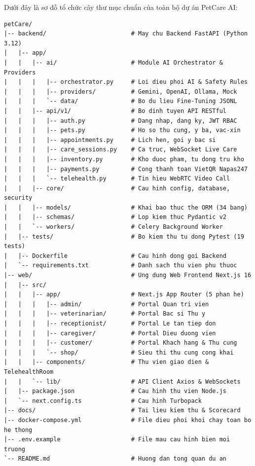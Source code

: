 Dưới đây là sơ đồ tổ chức cây thư mục chuẩn của toàn bộ dự án PetCare AI:
\begin{lstlisting}[language={}, caption={Cấu trúc cây thư mục mã nguồn dự án PetCare AI}, label={lst:tree}]
petCare/
|-- backend/                        # May chu Backend FastAPI (Python 3.12)
|   |-- app/
|   |   |-- ai/                     # Module AI Orchestrator & Providers
|   |   |   |-- orchestrator.py     # Loi dieu phoi AI & Safety Rules
|   |   |   |-- providers/          # Gemini, OpenAI, Ollama, Mock
|   |   |   `-- data/               # Bo du lieu Fine-Tuning JSONL
|   |   |-- api/v1/                 # Bo dinh tuyen API RESTful
|   |   |   |-- auth.py             # Dang nhap, dang ky, JWT RBAC
|   |   |   |-- pets.py             # Ho so thu cung, y ba, vac-xin
|   |   |   |-- appointments.py     # Lich hen, goi y bac si
|   |   |   |-- care_sessions.py    # Ca truc, WebSocket Live Care
|   |   |   |-- inventory.py        # Kho duoc pham, tu dong tru kho
|   |   |   |-- payments.py         # Cong thanh toan VietQR Napas247
|   |   |   `-- telehealth.py       # Tin hieu WebRTC Video Call
|   |   |-- core/                   # Cau hinh config, database, security
|   |   |-- models/                 # Khai bao thuc the ORM (34 bang)
|   |   |-- schemas/                # Lop kiem thuc Pydantic v2
|   |   `-- workers/                # Celery Background Worker
|   |-- tests/                      # Bo kiem thu tu dong Pytest (19 tests)
|   |-- Dockerfile                  # Cau hinh dong goi Backend
|   `-- requirements.txt            # Danh sach thu vien phu thuoc
|-- web/                            # Ung dung Web Frontend Next.js 16
|   |-- src/
|   |   |-- app/                    # Next.js App Router (5 phan he)
|   |   |   |-- admin/              # Portal Quan tri vien
|   |   |   |-- veterinarian/       # Portal Bac si Thu y
|   |   |   |-- receptionist/       # Portal Le tan tiep don
|   |   |   |-- caregiver/          # Portal Dieu duong vien
|   |   |   |-- customer/           # Portal Khach hang & Thu cung
|   |   |   `-- shop/               # Sieu thi thu cung cong khai
|   |   |-- components/             # Thu vien giao dien & TelehealthRoom
|   |   `-- lib/                    # API Client Axios & WebSockets
|   |-- package.json                # Cau hinh thu vien Node.js
|   `-- next.config.ts              # Cau hinh Turbopack
|-- docs/                           # Tai lieu kiem thu & Scorecard
|-- docker-compose.yml              # File dieu phoi khoi chay toan bo he thong
|-- .env.example                    # File mau cau hinh bien moi truong
`-- README.md                       # Huong dan tong quan du an
\end{lstlisting}
